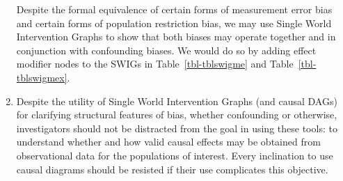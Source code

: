 \documentclass[
  single column]{article}
\begin{document}
\begin{enumerate}
  Despite the formal equivalence of certain forms of measurement error
  bias and certain forms of population restriction bias, we may use
  Single World Intervention Graphs to show that both biases may operate
  together and in conjunction with confounding biases. We would do so by
  adding effect modifier nodes to the SWIGs in Table~\ref{tbl-tblswigme}
  and Table~\ref{tbl-tblswigmex}.
\item
  Despite the utility of Single World Intervention Graphs (and causal
  DAGs) for clarifying structural features of bias, whether confounding
  or otherwise, investigators should not be distracted from the goal in
  using these tools: to understand whether and how valid causal effects
  may be obtained from observational data for the populations of
  interest. Every inclination to use causal diagrams should be resisted
  if their use complicates this objective.
\end{enumerate}
\end{document}
